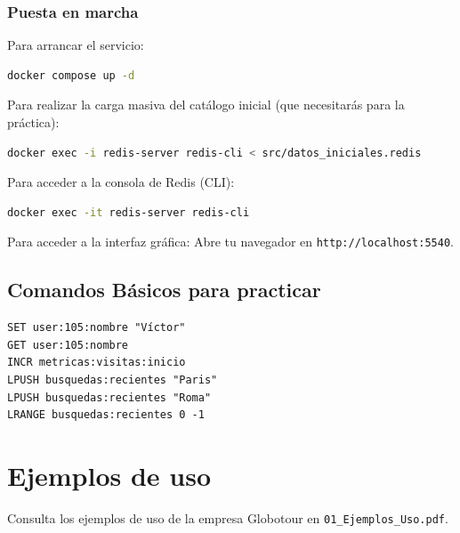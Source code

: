 \documentclass[12pt,a4paper]{article}
\begin{document}
\subsubsection{Puesta en marcha}\label{puesta-en-marcha}

Para arrancar el servicio:

\begin{lstlisting}[language=bash]
docker compose up -d
\end{lstlisting}

Para realizar la carga masiva del catálogo inicial (que necesitarás para
la práctica):

\begin{lstlisting}[language=bash]
docker exec -i redis-server redis-cli < src/datos_iniciales.redis
\end{lstlisting}

Para acceder a la consola de Redis (CLI):

\begin{lstlisting}[language=bash]
docker exec -it redis-server redis-cli
\end{lstlisting}

Para acceder a la interfaz gráfica: Abre tu navegador en
\texttt{http://localhost:5540}.

\hypertarget{comandos-buxe1sicos-para-practicar}{%
\subsection{Comandos Básicos para
practicar}\label{comandos-buxe1sicos-para-practicar}}

\begin{lstlisting}
SET user:105:nombre "Víctor"
GET user:105:nombre
INCR metricas:visitas:inicio
LPUSH busquedas:recientes "Paris"
LPUSH busquedas:recientes "Roma"
LRANGE busquedas:recientes 0 -1
\end{lstlisting}

\section{Ejemplos de uso}

Consulta los ejemplos de uso de la empresa Globotour en \texttt{01\_Ejemplos\_Uso.pdf}.
\end{document}
